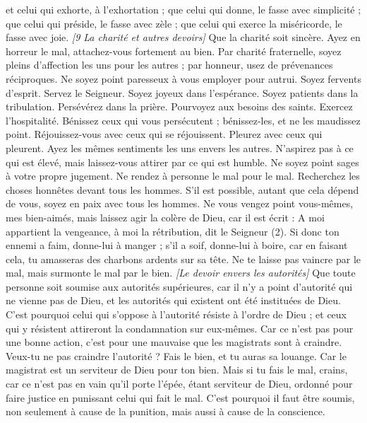 \begin{multicols}{2}
et celui qui exhorte, à l’exhortation ; que celui qui donne, le fasse avec simplicité ; que celui qui préside, le fasse avec zèle ; que celui qui exerce la miséricorde, le fasse avec joie.
\textit{[9 La charité et autres devoirs]}
Que la charité soit sincère. Ayez en horreur le mal, attachez-vous fortement au bien.
Par charité fraternelle, soyez pleins d’affection les uns pour les autres ; par honneur, usez de prévenances réciproques.
Ne soyez point paresseux à vous employer pour autrui. Soyez fervents d'esprit. Servez le Seigneur.
Soyez joyeux dans l'espérance. Soyez patients dans la tribulation. Persévérez dans la prière.
Pourvoyez aux besoins des saints. Exercez l'hospitalité.
Bénissez ceux qui vous persécutent ; bénissez-les, et ne les maudissez point.
Réjouissez-vous avec ceux qui se réjouissent. Pleurez avec ceux qui pleurent.
Ayez les mêmes sentiments les uns envers les autres. N’aspirez pas à ce qui est élevé, mais laissez-vous attirer par ce qui est humble. Ne soyez point sages à votre propre jugement.
Ne rendez à personne le mal pour le mal. Recherchez les choses honnêtes devant tous les hommes.
S’il est possible, autant que cela dépend de vous, soyez en paix avec tous les hommes.
Ne vous vengez point vous-mêmes, mes bien-aimés, mais laissez agir la colère de Dieu, car il est écrit : A moi appartient la vengeance, à moi la rétribution, dit le Seigneur (2).
Si donc ton ennemi a faim, donne-lui à manger ; s'il a soif, donne-lui à boire, car en faisant cela, tu amasseras des charbons ardents sur sa tête.
Ne te laisse pas vaincre par le mal, mais surmonte le mal par le bien.
\textit{[Le devoir envers les autorités]}
\VerseOne{}Que toute personne soit soumise aux autorités supérieures, car il n'y a point d’autorité qui ne vienne pas de Dieu, et les autorités qui existent ont été instituées de Dieu.
C'est pourquoi celui qui s’oppose à l’autorité résiste à l’ordre de Dieu ; et ceux qui y résistent attireront la condamnation sur eux-mêmes.
Car ce n’est pas pour une bonne action, c’est pour une mauvaise que les magistrats sont à craindre. Veux-tu ne pas craindre l’autorité ? Fais le bien, et tu auras sa louange.
Car le magistrat est un serviteur de Dieu pour ton bien. Mais si tu fais le mal, crains, car ce n’est pas en vain qu’il porte l'épée, étant serviteur de Dieu, ordonné pour faire justice en punissant celui qui fait le mal.
C'est pourquoi il faut être soumis, non seulement à cause de la punition, mais aussi à cause de la conscience.

\end{multicols}
